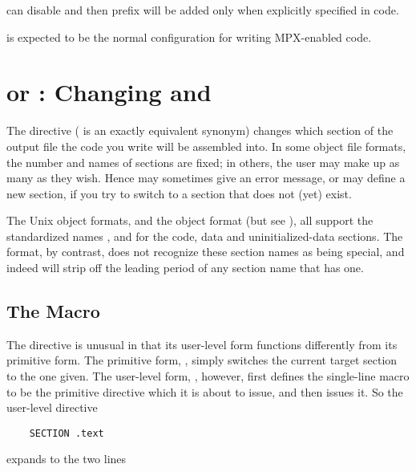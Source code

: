 can disable  and then
 prefix will be added only when explicitly specified
in code.

 is expected to be the normal configuration
for writing MPX-enabled code.

\section{ or : Changing and
}
\label{sec:section}

The  directive ( is an exactly equivalent
synonym) changes which section of the output file the code you write
will be assembled into. In some object file formats, the number and
names of sections are fixed; in others, the user may make up as many
as they wish. Hence  may sometimes give an error message,
or may define a new section, if you try to switch to a section that does
not (yet) exist.

The Unix object formats, and the  object format (but see
), all support the 
standardized names ,  and  for the code,
data and uninitialized-data sections. The  format, by contrast,
does not recognize these section names as being special, and indeed will
strip off the leading period of any section name that has one.

\subsection{The  Macro}
\label{subsec:sectmac}

The  directive is unusual in that its user-level form
functions differently from its primitive form. The primitive form,
, simply switches the current target section to the
one given. The user-level form, , however, first
defines the single-line macro  to be the primitive
\code{[SECTION]} directive which it is about to issue, and then issues
it. So the user-level directive

\begin{lstlisting}
    SECTION .text
\end{lstlisting}

expands to the two lines

